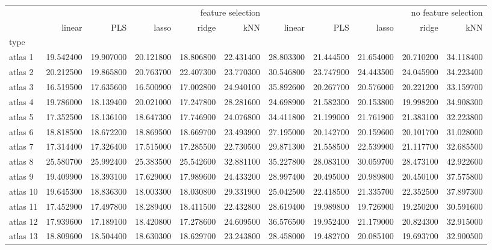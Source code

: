 \documentclass[a4paper]{article}
\begin{document}
\thispagestyle{empty}
\begin{landscape}
\begin{tabular}{lrrrrrrrrrr}
\toprule
 & \multicolumn{5}{r}{feature selection} & \multicolumn{5}{r}{no feature selection} \\
 & linear & PLS & lasso & ridge & kNN & linear & PLS & lasso & ridge & kNN \\
type &  &  &  &  &  &  &  &  &  &  \\
\midrule
atlas 1 & 19.542400 & 19.907000 & 20.121800 & 18.806800 & 22.431400 & 28.803300 & 21.444500 & 21.654000 & 20.710200 & 34.118400 \\
atlas 2 & 20.212500 & 19.865800 & 20.763700 & 22.407300 & 23.770300 & 30.546800 & 23.747900 & 24.443500 & 24.045900 & 34.223400 \\
atlas 3 & 16.519500 & 17.635600 & 16.500900 & 17.002800 & 24.940100 & 35.892600 & 20.267700 & 20.576000 & 20.221200 & 33.159700 \\
atlas 4 & 19.786000 & 18.139400 & 20.021000 & 17.247800 & 28.281600 & 24.698900 & 21.582300 & 20.153800 & 19.998200 & 34.908300 \\
atlas 5 & 17.352500 & 18.136100 & 18.647300 & 17.746900 & 24.076800 & 34.411800 & 21.199000 & 21.761900 & 21.383100 & 32.223800 \\
atlas 6 & 18.818500 & 18.672200 & 18.869500 & 18.669700 & 23.493900 & 27.195000 & 20.142700 & 20.159600 & 20.101700 & 31.028000 \\
atlas 7 & 17.314400 & 17.326400 & 17.515000 & 17.285500 & 22.730500 & 29.871300 & 21.558500 & 22.539900 & 21.117700 & 32.685500 \\
atlas 8 & 25.580700 & 25.992400 & 25.383500 & 25.542600 & 32.881100 & 35.227800 & 28.083100 & 30.059700 & 28.473100 & 42.922600 \\
atlas 9 & 19.409900 & 18.393100 & 17.629000 & 17.989600 & 24.433200 & 28.997400 & 20.495000 & 20.989800 & 20.450100 & 37.575800 \\
atlas 10 & 19.645300 & 18.836300 & 18.003300 & 18.030800 & 29.331900 & 25.042500 & 22.418500 & 21.335700 & 22.352500 & 37.897300 \\
atlas 11 & 17.452900 & 17.497800 & 18.289400 & 18.411500 & 22.432800 & 28.619400 & 19.989800 & 19.726900 & 19.250200 & 30.591600 \\
atlas 12 & 17.939600 & 17.189100 & 18.420800 & 17.278600 & 24.609500 & 36.576500 & 19.952400 & 21.179000 & 20.824300 & 32.915000 \\
atlas 13 & 18.809600 & 18.504400 & 18.630300 & 18.629700 & 23.243800 & 28.458000 & 19.482700 & 20.085100 & 19.693700 & 32.900500 \\

\end{tabular}
\end{landscape}
\end{document}

